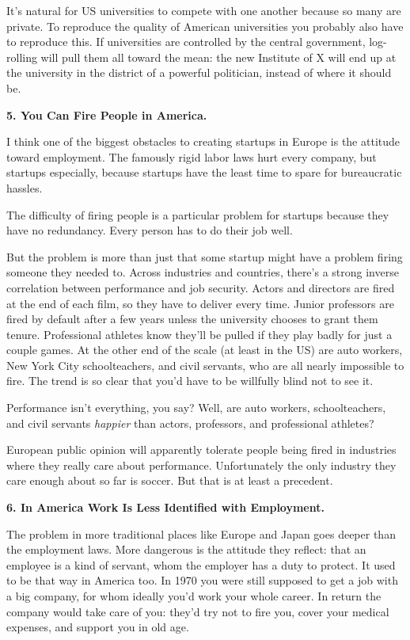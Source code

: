 \documentclass[12pt]{book}
\begin{document}
It's natural for US universities to compete with one another because so
many are private. To reproduce the quality of American universities you
probably also have to reproduce this. If universities are controlled by
the central government, log-rolling will pull them all toward the mean:
the new Institute of X will end up at the university in the district of
a powerful politician, instead of where it should be.

\textbf{5. You Can Fire People in America.}

I think one of the biggest obstacles to creating startups in Europe is
the attitude toward employment. The famously rigid labor laws hurt every
company, but startups especially, because startups have the least time
to spare for bureaucratic hassles.

The difficulty of firing people is a particular problem for startups
because they have no redundancy. Every person has to do their job well.

But the problem is more than just that some startup might have a problem
firing someone they needed to. Across industries and countries, there's
a strong inverse correlation between performance and job security.
Actors and directors are fired at the end of each film, so they have to
deliver every time. Junior professors are fired by default after a few
years unless the university chooses to grant them tenure. Professional
athletes know they'll be pulled if they play badly for just a couple
games. At the other end of the scale (at least in the US) are auto
workers, New York City schoolteachers, and civil servants, who are all
nearly impossible to fire. The trend is so clear that you'd have to be
willfully blind not to see it.

Performance isn't everything, you say? Well, are auto workers,
schoolteachers, and civil servants \emph{happier} than actors,
professors, and professional athletes?

European public opinion will apparently tolerate people being fired in
industries where they really care about performance. Unfortunately the
only industry they care enough about so far is soccer. But that is at
least a precedent.

\textbf{6. In America Work Is Less Identified with Employment.}

The problem in more traditional places like Europe and Japan goes deeper
than the employment laws. More dangerous is the attitude they reflect:
that an employee is a kind of servant, whom the employer has a duty to
protect. It used to be that way in America too. In 1970 you were still
supposed to get a job with a big company, for whom ideally you'd work
your whole career. In return the company would take care of you: they'd
try not to fire you, cover your medical expenses, and support you in old
age.
\end{document}
